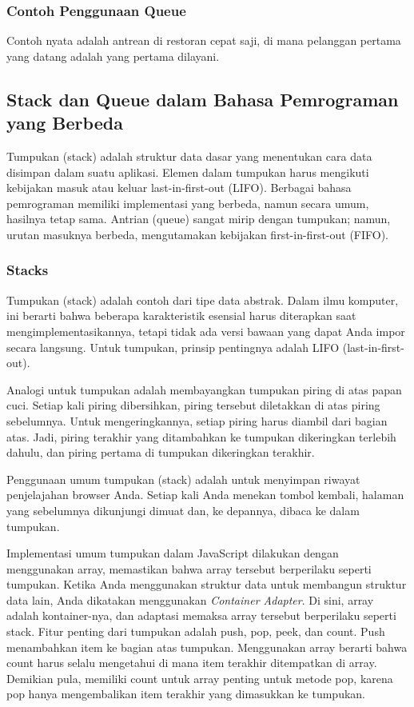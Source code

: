 \documentclass{article}
\begin{document}
\subsubsection{Contoh Penggunaan Queue}
Contoh nyata adalah antrean di restoran cepat saji, di mana pelanggan pertama yang datang adalah yang pertama dilayani.

\subsection{Stack dan Queue dalam Bahasa Pemrograman yang Berbeda}
Tumpukan (stack) adalah struktur data dasar yang menentukan cara data disimpan dalam suatu aplikasi. Elemen dalam tumpukan harus mengikuti kebijakan masuk atau keluar last-in-first-out (LIFO). Berbagai bahasa pemrograman memiliki implementasi yang berbeda, namun secara umum, hasilnya tetap sama. Antrian (queue) sangat mirip dengan tumpukan; namun, urutan masuknya berbeda, mengutamakan kebijakan first-in-first-out (FIFO).

\subsubsection{Stacks}
Tumpukan (stack) adalah contoh dari tipe data abstrak. Dalam ilmu komputer, ini berarti bahwa beberapa karakteristik esensial harus diterapkan saat mengimplementasikannya, tetapi tidak ada versi bawaan yang dapat Anda impor secara langsung. Untuk tumpukan, prinsip pentingnya adalah LIFO (last-in-first-out).

Analogi untuk tumpukan adalah membayangkan tumpukan piring di atas papan cuci. Setiap kali piring dibersihkan, piring tersebut diletakkan di atas piring sebelumnya. Untuk mengeringkannya, setiap piring harus diambil dari bagian atas. Jadi, piring terakhir yang ditambahkan ke tumpukan dikeringkan terlebih dahulu, dan piring pertama di tumpukan dikeringkan terakhir.

Penggunaan umum tumpukan (stack) adalah untuk menyimpan riwayat penjelajahan browser Anda. Setiap kali Anda menekan tombol kembali, halaman yang sebelumnya dikunjungi dimuat dan, ke depannya, dibaca ke dalam tumpukan.

Implementasi umum tumpukan dalam JavaScript dilakukan dengan menggunakan array, memastikan bahwa array tersebut berperilaku seperti tumpukan. Ketika Anda menggunakan struktur data untuk membangun struktur data lain, Anda dikatakan menggunakan \textit{Container Adapter}. Di sini, array adalah kontainer-nya, dan adaptasi memaksa array tersebut berperilaku seperti stack. Fitur penting dari tumpukan adalah push, pop, peek, dan count. Push menambahkan item ke bagian atas tumpukan. Menggunakan array berarti bahwa count harus selalu mengetahui di mana item terakhir ditempatkan di array. Demikian pula, memiliki count untuk array penting untuk metode pop, karena pop hanya mengembalikan item terakhir yang dimasukkan ke tumpukan.
\end{document}
